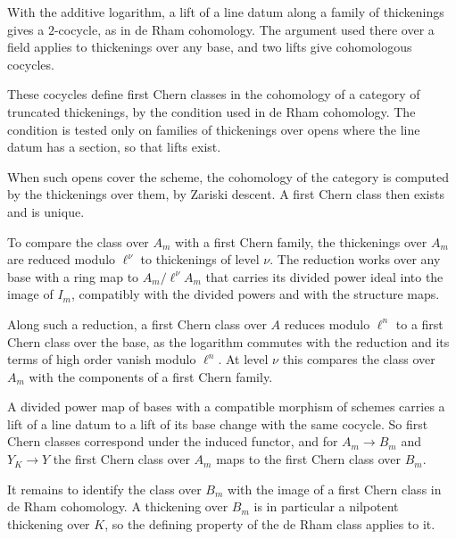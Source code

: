 With the additive logarithm, a lift of a line datum along a family of thickenings gives a $2$-cocycle, as in de Rham
cohomology. The argument used there over a field applies to thickenings over any base, and two lifts give cohomologous
cocycles.

These cocycles define first Chern classes in the cohomology of a category of truncated thickenings, by the condition used
in de Rham cohomology. The condition is tested only on families of thickenings over opens where the line datum has a
section, so that lifts exist.

When such opens cover the scheme, the cohomology of the category is computed by the thickenings over them, by Zariski
descent. A first Chern class then exists and is unique.

To compare the class over $A_m$ with a first Chern family, the thickenings over $A_m$ are reduced modulo $\ell^\nu$ to
thickenings of level $\nu$. The reduction works over any base with a ring map to $A_m/\ell^\nu A_m$ that carries its
divided power ideal into the image of $I_m$, compatibly with the divided powers and with the structure maps.

Along such a reduction, a first Chern class over $A$ reduces modulo $\ell^n$ to a first Chern class over the base, as the
logarithm commutes with the reduction and its terms of high order vanish modulo $\ell^n$. At level $\nu$ this compares the
class over $A_m$ with the components of a first Chern family.

A divided power map of bases with a compatible morphism of schemes carries a lift of a line datum to a lift of its base
change with the same cocycle. So first Chern classes correspond under the induced functor, and for $A_m\to B_m$ and
$Y_K\to Y$ the first Chern class over $A_m$ maps to the first Chern class over $B_m$.

It remains to identify the class over $B_m$ with the image of a first Chern class in de Rham cohomology. A thickening over
$B_m$ is in particular a nilpotent thickening over $K$, so the defining property of the de Rham class applies to it.

